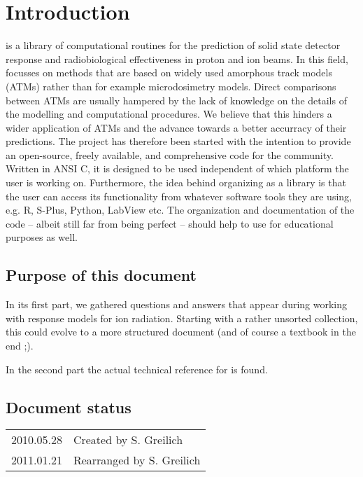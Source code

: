 
\chapter{Introduction}

\la{} is a library of computational routines for the prediction of solid state
detector response and radiobiological effectiveness in proton and ion beams. In
this field, \la{} focusses on methods that are based on widely used amorphous
track models (ATMs) rather than for example microdosimetry models. Direct
comparisons between ATMs are usually hampered by the lack of knowledge on the
details of the modelling and computational procedures. We believe that this
hinders a wider application of ATMs and the advance towards a better accurracy
of their predictions. The \la{} project has therefore been started with the
intention to provide an open-source, freely available, and comprehensive code
for the community. Written in ANSI C, it is designed to be used independent of
which platform the user is working on. Furthermore, the idea behind organizing
\la{} as a library is that the user can access its functionality from whatever
software tools they are using, e.g. R, S-Plus, Python, LabView etc. The
organization and documentation of the code -- albeit still far from being
perfect -- should help to use \la{} for educational purposes as well.

\section{Purpose of this document}
In its first part, we gathered questions and answers that
appear during working with response models for ion radiation. Starting
with a rather unsorted collection, this could evolve to a more structured
document (and of course a textbook in the end ;).

In the second part the actual technical reference for \la is found.

\section*{Document status}
\begin{tabular}{l l}
2010.05.28&Created by S. Greilich\\
2011.01.21&Rearranged by S. Greilich
\end{tabular}